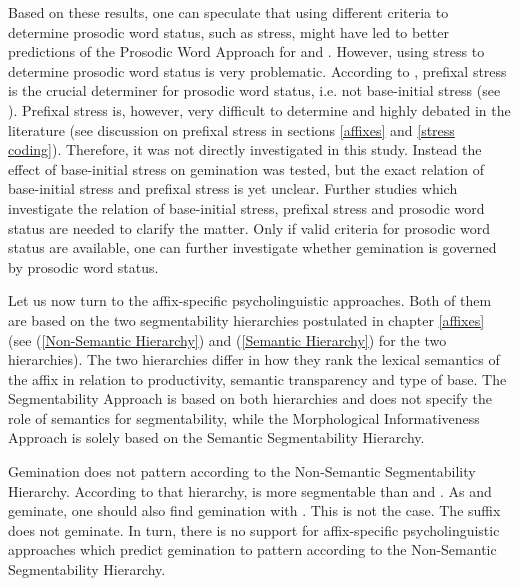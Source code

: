 Based on these results, one can speculate that using different criteria to determine prosodic word status, such as stress, might have led to better predictions of the Prosodic Word Approach for  and . 
However, using stress to determine prosodic word status is very problematic. %
 According to \cite{Raffelsiefen.1999}, prefixal stress is the crucial determiner for prosodic word status, i.e. not base-initial stress (see ). Prefixal stress is, however, very difficult to determine and highly debated in the literature (see discussion on prefixal stress in sections \ref{affixes} and \ref{stress coding}). Therefore, it was not directly investigated in this study. Instead the effect of base-initial stress on gemination was tested, but the exact relation of base-initial stress and prefixal stress is yet unclear.
Further studies which investigate the relation of base-initial stress, prefixal stress and prosodic word status are needed to clarify the matter. Only if valid criteria for prosodic word status are available, one can further investigate whether gemination is governed by prosodic word status. 

 




Let us now turn to the affix-specific psycholinguistic approaches. Both of them are based on the two segmentability hierarchies postulated in chapter \ref{affixes} (see  (\ref{Non-Semantic Hierarchy})  and (\ref{Semantic Hierarchy}) for the two hierarchies).
The two hierarchies differ in how they rank the lexical semantics of the affix in relation to productivity, semantic transparency and type of base. The Segmentability Approach is based on both hierarchies and does not specify the role of semantics for segmentability, while the Morphological Informativeness Approach is solely based on the Semantic Segmentability Hierarchy.%

Gemination does not pattern according to the Non-Semantic Segmentability Hierarchy. According to that hierarchy,  is more segmentable than  and . As  and  geminate, one should also find gemination with . This is not the case. The suffix  does not geminate.  In turn, there is no support for affix-specific psycholinguistic approaches which predict gemination to pattern according to the Non-Semantic Segmentability Hierarchy.



